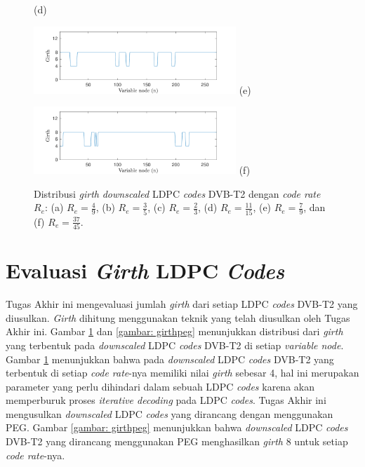 \begin{figure}[tb]
\begin{minipage}{.5\linewidth}
	\vspace{-1cm}
	\center (d)
\end{minipage}
	\hspace{-0.2 cm}
\begin{minipage}{.5\linewidth}
		\hspace{-0.45 cm}
	\includegraphics[width=3in]{pics/girth/girthds7-9.pdf}
	\vspace{-1cm}
	\center (e)
\end{minipage}
\hfill
	\hspace{-0.2 cm}
\begin{minipage}{.5\linewidth}
		\hspace{-0.45 cm}
	\includegraphics[width=3in]{pics/girth/girthds37-45.pdf}
	\vspace{-1cm}
	\center (f)
\end{minipage}
	\caption {Distribusi \textit{girth} \textit{downscaled} LDPC \textit{codes} DVB-T2 dengan \textit{code rate} $R_e$: (a) $ R_e=\frac{4}{9} $, (b) $R_e=\frac{3}{5}$, (c) $R_e=\frac{2}{3}$, (d) $R_e=\frac{11}{15}$, (e) $R_e=\frac{7}{9}$, dan (f) $R_e=\frac{37}{45}$.}
	\label{gambar: girthds}
\end{figure}

\section{Evaluasi \textit{Girth} LDPC \textit{Codes}}
Tugas Akhir ini mengevaluasi jumlah \textit{girth} dari setiap LDPC \textit{codes} DVB-T2 yang diusulkan. \textit{Girth} dihitung menggunakan teknik yang telah diusulkan oleh Tugas Akhir ini. Gambar \ref{gambar: girthds} dan \ref{gambar: girthpeg} menunjukkan distribusi dari \textit{girth} yang terbentuk pada \textit{downscaled} LDPC \textit{codes} DVB-T2 di setiap \textit{variable node}. Gambar \ref{gambar: girthds} menunjukkan bahwa pada \textit{downscaled} LDPC \textit{codes} DVB-T2 yang terbentuk di setiap \textit{code rate}-nya memiliki nilai \textit{girth} sebesar 4, hal ini merupakan parameter yang perlu dihindari dalam sebuah LDPC \textit{codes} karena akan memperburuk proses \textit{iterative decoding} pada LDPC \textit{codes}. Tugas Akhir ini mengusulkan \textit{downscaled} LDPC \textit{codes} yang dirancang dengan menggunakan PEG. Gambar \ref{gambar: girthpeg} menunjukkan bahwa \textit{downscaled} LDPC \textit{codes} DVB-T2 yang dirancang menggunakan PEG menghasilkan \textit{girth} 8 untuk setiap \textit{code rate}-nya. 

